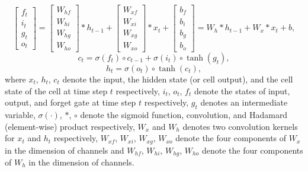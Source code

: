 \begin{equation}
	\left[\begin{array}{c}
		f_t\\i_t\\g_t\\o_t
	\end{array}\right] = \left[\begin{array}{c}
		W_{hf}\\W_{hi}\\W_{hg}\\W_{ho}
	\end{array}\right] * h_{t-1} + \left[\begin{array}{c}
		W_{xf}\\W_{xi}\\W_{xg}\\W_{xo}
	\end{array}\right] * x_{t} + \left[\begin{array}{c}
		b_f\\b_i\\b_g\\b_o
	\end{array}\right] = W_h * h_{t-1} + W_x * x_t + b,
\end{equation}
\begin{equation}
	c_t = \sigma(f_t) \circ c_{t-1} + \sigma(i_t) \circ \tanh(g_t),
\end{equation}
\begin{equation}
	h_t = \sigma(o_t) \circ \tanh(c_t),
\end{equation}
where $x_t$, $h_t$, $c_t$ denote the input, the hidden state (or cell output), and the cell state of the cell at time step $t$ respectively, $i_t$, $o_t$, $f_t$ denote the states of input, output, and forget gate at time step $t$ respectively, $g_t$ denotes an intermediate variable, $\sigma(\cdot)$, $*$, $\circ$ denote the sigmoid function, convolution, and Hadamard (element-wise) product respectively, $W_x$ and $W_h$ denotes two convolution kernels for $x_t$ and $h_t$ respectively, $W_{xf}$, $W_{xi}$, $W_{xg}$, $W_{xo}$ denote the four components of $W_x$ in the dimension of channels and $W_{hf}$, $W_{hi}$, $W_{hg}$, $W_{ho}$ denote the four components of $W_h$ in the dimension of channels.



